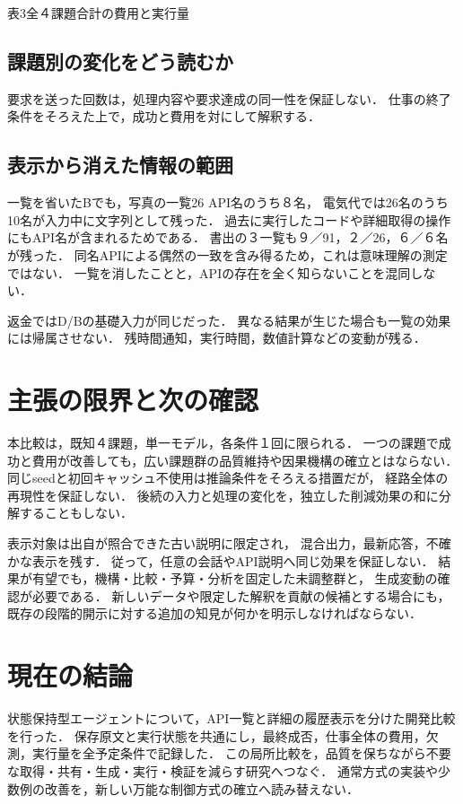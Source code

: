 \documentclass[uplatex,a4paper,twocolumn,10pt]{jsarticle}
\begin{document}
\begin{center}\begin{minipage}{\columnwidth}\centering
\small 表3\quad 全４課題合計の費用と実行量\par\smallskip
\InventoryTotals
\end{minipage}\end{center}

\subsection{課題別の変化をどう読むか}
\InventoryCaseEvidence
要求を送った回数は，処理内容や要求達成の同一性を保証しない．
仕事の終了条件をそろえた上で，成功と費用を対にして解釈する．

\subsection{表示から消えた情報の範囲}
一覧を省いたBでも，写真の一覧26 API名のうち８名，
電気代では26名のうち10名が入力中に文字列として残った．
過去に実行したコードや詳細取得の操作にもAPI名が含まれるためである．
書出の３一覧も９／91，２／26，６／６名が残った．
同名APIによる偶然の一致を含み得るため，これは意味理解の測定ではない．
一覧を消したことと，APIの存在を全く知らないことを混同しない．

返金ではD/Bの基礎入力が同じだった．
異なる結果が生じた場合も一覧の効果には帰属させない．
残時間通知，実行時間，数値計算などの変動が残る．
\InventoryVariation

\section{主張の限界と次の確認}
本比較は，既知４課題，単一モデル，各条件１回に限られる．
一つの課題で成功と費用が改善しても，広い課題群の品質維持や因果機構の確立とはならない．
同じseedと初回キャッシュ不使用は推論条件をそろえる措置だが，
経路全体の再現性を保証しない．
後続の入力と処理の変化を，独立した削減効果の和に分解することもしない．

表示対象は出自が照合できた古い説明に限定され，
混合出力，最新応答，不確かな表示を残す．
従って，任意の会話やAPI説明へ同じ効果を保証しない．
結果が有望でも，機構・比較・予算・分析を固定した未調整群と，
生成変動の確認が必要である．
新しいデータや限定した解釈を貢献の候補とする場合にも，
既存の段階的開示に対する追加の知見が何かを明示しなければならない．

\section{現在の結論}
状態保持型エージェントについて，API一覧と詳細の履歴表示を分けた開発比較を行った．
保存原文と実行状態を共通にし，最終成否，仕事全体の費用，欠測，実行量を全予定条件で記録した．
この局所比較を，品質を保ちながら不要な取得・共有・生成・実行・検証を減らす研究へつなぐ．
通常方式の実装や少数例の改善を，新しい万能な制御方式の確立へ読み替えない．
\end{document}
